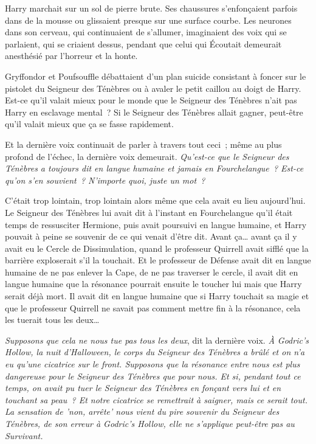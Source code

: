 Harry marchait sur un sol de pierre brute. Ses chaussures s'enfonçaient parfois dans de la mousse ou glissaient presque sur une surface courbe. Les neurones dans son cerveau, qui continuaient de s'allumer, imaginaient des voix qui se parlaient, qui se criaient dessus, pendant que celui qui Écoutait demeurait anesthésié par l'horreur et la honte.

Gryffondor et Poufsouffle débattaient d'un plan suicide consistant à foncer sur le pistolet du Seigneur des Ténèbres ou à avaler le petit caillou au doigt de Harry. Est-ce qu'il valait mieux pour le monde que le Seigneur des Ténèbres n'ait pas Harry en esclavage mental~? Si le Seigneur des Ténèbres allait gagner, peut-être qu'il valait mieux que ça se fasse rapidement.

Et la dernière voix continuait de parler à travers tout ceci~; même au plus profond de l'échec, la dernière voix demeurait. \emph{Qu'est-ce que le Seigneur des Ténèbres a toujours dit en langue humaine et jamais en Fourchelangue~? Est-ce qu'on s'en souvient~? N'importe quoi, juste un mot~?}

C'était trop lointain, trop lointain alors même que cela avait eu lieu aujourd'hui. Le Seigneur des Ténèbres lui avait dit à l'instant en Fourchelangue qu'il était temps de ressusciter Hermione, puis avait poursuivi en langue humaine, et Harry pouvait à peine se souvenir de ce qui venait d'être dit. Avant ça… avant ça il y avait eu le Cercle de Dissimulation, quand le professeur Quirrell avait sifflé que la barrière exploserait s'il la touchait. Et le professeur de Défense avait dit en langue humaine de ne pas enlever la Cape, de ne pas traverser le cercle, il avait dit en langue humaine que la résonance pourrait ensuite le toucher lui mais que Harry serait déjà mort. Il avait dit en langue humaine que si Harry touchait sa magie et que le professeur Quirrell ne savait pas comment mettre fin à la résonance, cela les tuerait tous les deux…

\emph{Supposons que cela ne nous tue pas tous les deux}, dit la dernière voix. \emph{À Godric's Hollow, la nuit d'Halloween, le corps du Seigneur des Ténèbres a brûlé et on n'a eu qu'une cicatrice sur le front. Supposons que la résonance entre nous est plus dangereuse pour le Seigneur des Ténèbres que pour nous. Et si, pendant tout ce temps, on avait pu tuer le Seigneur des Ténèbres en fonçant vers lui et en touchant sa peau~? Et notre cicatrice se remettrait à saigner, mais ce serait tout. La sensation de 'non, arrête' nous vient du pire souvenir du Seigneur des Ténèbres, de son erreur à Godric's Hollow, elle ne s'applique peut-être pas au Survivant.}

